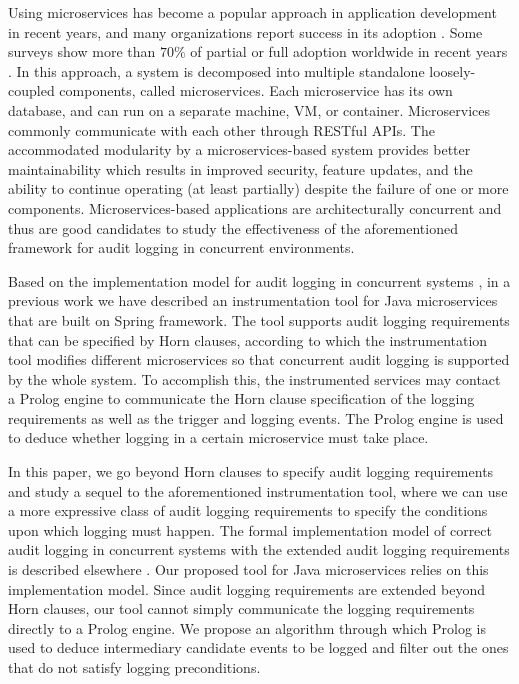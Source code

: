 Using microservices has become a popular approach in application development in recent years, and many organizations report success in its adoption \cite{Reilly}. Some surveys show more than $70\%$ of partial or full adoption worldwide in recent years \cite{Statista}. In this approach, a system is decomposed into multiple standalone loosely-coupled components, called microservices. Each microservice has its own database, and can run on a separate machine, VM, or container. Microservices commonly communicate with each other through RESTful APIs. The accommodated  modularity by a microservices-based system provides better maintainability which results in improved security, feature updates, and the ability to continue operating (at least partially)  despite the failure of one or more components. Microservices-based applications are architecturally concurrent and thus are good candidates to study the effectiveness of the aforementioned framework for audit logging in concurrent environments. 

Based on the implementation model for audit logging in concurrent systems \cite{lsfa20}, in a previous work \cite{stpsa21} we have described an instrumentation tool for Java microservices that are built on Spring framework. The tool supports audit logging requirements that can be specified by Horn clauses, according to which the instrumentation tool modifies different microservices so that concurrent audit logging is supported by the whole system. To accomplish this, the instrumented services may contact a Prolog engine to communicate the Horn clause specification of the logging requirements as well as the trigger and logging events. The Prolog engine is used to deduce whether logging in a certain microservice must take place. 

In this paper, we go beyond Horn clauses to specify audit logging requirements and study a sequel to the aforementioned instrumentation tool, where we can use a more expressive class of audit logging requirements to specify the conditions upon which logging must happen. The formal implementation model of correct audit logging in concurrent systems with the extended audit logging requirements is described elsewhere \cite{amirmoh-tr21}. Our proposed tool for Java microservices relies on this implementation model. Since audit logging requirements are extended beyond Horn clauses, our tool cannot simply communicate the logging requirements directly to a Prolog engine. We propose an algorithm through which Prolog is used to deduce intermediary candidate events to be logged and  filter out the ones that do not satisfy logging preconditions.

